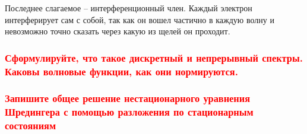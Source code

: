 Последнее слагаемое -- интерференционный член. Каждый электрон интерферирует сам  с собой, так как он вошел частично в каждую волну и невозможно точно сказать через какую из щелей он проходит.

\subsubsection{\textcolor{red} {Сформулируйте, что такое дискретный и непрерывный спектры. Каковы волновые
функции, как они нормируются.} }

\subsubsection{\textcolor{red} {Запишите общее решение нестационарного уравнения Шредингера с помощью
разложения по стационарным состояниям} }
